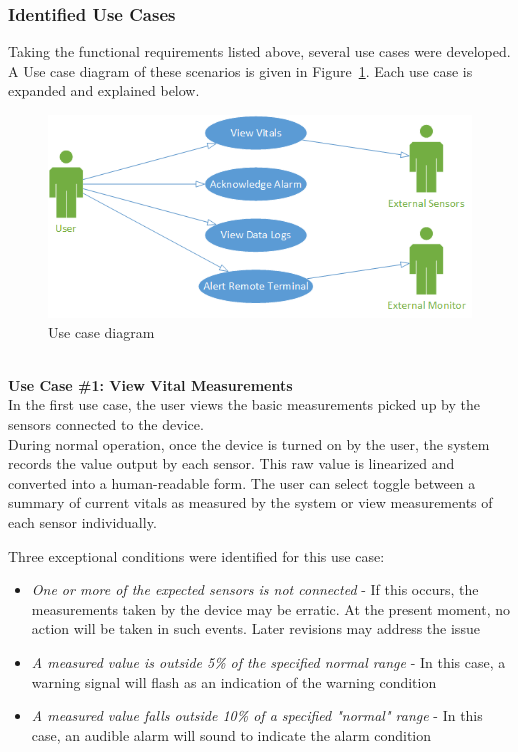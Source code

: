 \documentclass[12pt]{article} %
\begin{document}
\subsubsection{Identified Use Cases}
Taking the functional requirements listed above, several use cases were
developed. A Use case diagram of these scenarios is given in
Figure~\ref{fig:useCases}. Each use case is expanded and explained below.

\begin{figure}[h]
  \centering
  \includegraphics[width=\textwidth]{../design/use_cases_graphical.png}
  \caption{Use case diagram}
  \label{fig:useCases}
\end{figure}

~\\
\textbf{Use Case \#1: View Vital Measurements } \\
In the first use case, the user views the basic measurements picked up by the
sensors connected to the device. \\
During normal operation, once the device is turned on by the user, the system
records the value output by each sensor. This raw value is linearized and 
converted into a human-readable form. The user can select toggle between a
summary of current vitals as measured by the system or view measurements of
each sensor individually.

Three exceptional conditions were identified for this use case: 
\begin{itemize}
  \item \emph{One or more of the expected sensors is not connected} - If this occurs, the measurements taken by the device may be erratic. At the present moment, no action will be taken in such events. Later revisions may address the issue
  \item \emph{A measured value is outside 5\% of the specified normal range} - In this case, a warning signal will flash as an indication of the warning condition
  \item \emph{A measured value falls outside 10\% of a specified "normal" range} - In this case, an audible alarm will sound to indicate the alarm condition
\end{itemize}
\end{document}
